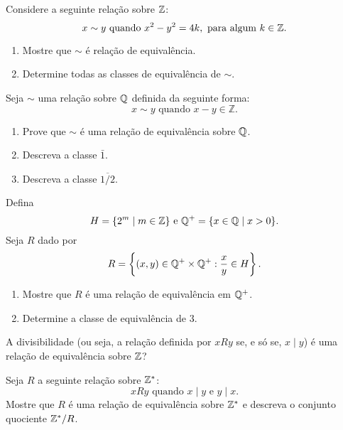 \documentclass[12pt]{exam}
\begin{document}
\vspace{.3cm}

\questao Considere a seguinte rela\c{c}\~ao sobre $\mathbb{Z}$:
\[
	x \sim y \mbox{ quando }  x^2 - y^2 = 4k, \mbox{ para algum } k \in \mathbb{Z}.
\]
\begin{enumerate}[label={\alph*})]
	\item Mostre que $\sim$ {\'e} rela{\c c}{\~a}o de equival{\^e}ncia.
	\item Determine todas as classes de equival\^encia de $\sim$.
\end{enumerate}
\vspace{.3cm}

\questao Seja $\sim$ uma rela{\c c}{\~a}o sobre $\mathbb{Q}$ definida da seguinte forma:
\[
    x \sim y \mbox{ quando } x-y \in \mathbb{Z}.
\]
\begin{enumerate}[label={\alph*})]
\item Prove que $\sim$ {\'e} uma rela{\c c}{\~a}o de equival{\^e}ncia sobre $\mathbb{Q}$.
\item Descreva a classe $\bar{1}$.
\item Descreva a classe $\overline{1/2}$.
\end{enumerate}

\vspace{.3cm}

\questao Defina
\[
	H = \{2^m \mid m \in \mathbb{Z}\} \mbox{ e } \mathbb{Q}^+ = \{x \in \mathbb{Q} \mid x > 0\}.
\]
Seja $R$ dado por
\[
	R = \left\{(x,y) \in \mathbb{Q}^+\times \mathbb{Q}^+ : \frac{x}{y} \in H\right\}.
\]
\begin{enumerate}[label={\alph*})]
	\item Mostre que $R$ \'e uma rela\c{c}\~ao de equival\^encia em $\mathbb{Q}^+$.
	\item Determine a classe de equival\^encia de $3$.
\end{enumerate}
\vspace{.3cm}

\questao A divisibilidade (ou seja, a rela{\c c}{\~a}o definida por $xRy$ se, e s{\'o}
se, $x \mid y$) {\'e} uma rela{\c c}{\~a}o de equival{\^e}ncia sobre $\mathbb{Z}$?

\vspace{.3cm}

\questao Seja $R$ a seguinte rela{\c c}{\~a}o sobre $\mathbb{Z}^*$:
\[
xRy \mbox{ quando } x\mid y \mbox{ e } y\mid x.
\]
Mostre que $R$ {\'e} uma rela{\c c}{\~a}o de equival{\^e}ncia sobre $\mathbb{Z}^*$ e
descreva o conjunto quociente $\mathbb{Z}^*/R$.

\vspace{.3cm}
\end{document}
